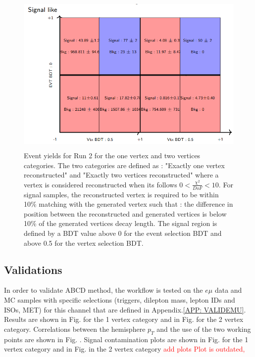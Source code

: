 \documentclass{cernatlasnote}
\begin{document}
        \begin{figure}[ht]
\centering
\includegraphics[height=8cm, width=12cm, trim= 0cm 0cm 0cm 0cm,clip]{images/ABCD/EVTYieldsRun2.png}
\caption{\label{fig:EVTYIELDS} Event yields for Run 2 for the one vertex and two vertices categories. The two categories are defined as : "Exactly one vertex reconstructed" and "Exactly two vertices reconstructed" where a vertex is considered reconstructed when its follows $0<\frac{\chi^2}{DoF}<10$. For signal samples, the reconstructed vertex is required to be within 10\% matching with the generated vertex such that : the difference in position between the reconstructed and generated vertices is below 10\% of the generated vertices decay length. The signal region is defined by a BDT value above 0 for the event selection BDT and above 0.5 for the vertex selection BDT. }
\end{figure}  
\FloatBarrier
        \subsection{Validations}
        In order to validate ABCD method, the workflow is tested on the $e\mu$ data and MC samples with specific selections (triggers, dilepton mass, lepton IDs and ISOs, MET) for this channel that are defined in Appendix.\ref{APP: VALIDEMU}. Results are shown in Fig. for the 1 vertex category and in Fig. for the 2 vertex category.
        Correlations between the hemisphere $p_T$ and the use of the two working points are shown in Fig. .
        Signal contamination plots are shown in Fig. for the 1 vertex category and in Fig. in the 2 vertex category \textcolor{red}{add plots}
        \textcolor{red}{Plot is outdated,}
   
    \newpage
\end{document}
